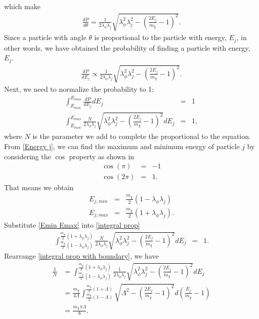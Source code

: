 \documentclass[10pt, oneside]{book}
\numberwithin{equation}{chapter}
\begin{document}
which make
\begin{eqnarray}
    \frac{dP}{d\theta} = \frac{1}{2\lambda_\phi\lambda_j} \sqrt{\lambda_\phi^2\lambda_j^2 - \left(\frac{2E_j}{m_\chi}-1\right)^2}.
\end{eqnarray}
Since a particle with angle $\theta$ is proportional to the particle with energy, $E_j$, in other words, we have obtained the probability of finding a particle with energy, $E_j$.
\begin{eqnarray}
    \frac{dP}{dE_j} \propto \frac{1}{2\lambda_\phi\lambda_j} \sqrt{\lambda_\phi^2\lambda_j^2 - \left(\frac{2E_j}{m_\chi}-1\right)^2}.
\end{eqnarray}
Next, we need to normalize the probability to 1: 
\begin{eqnarray}\label{integral prop}
    \int_{E_{min}}^{E_{max}} \frac{dP}{dE_j}dE_j &=& 1\\
    \int_{E_{min}}^{E_{max}} \frac{N}{2\lambda_\phi\lambda_j} \sqrt{\lambda_\phi^2\lambda_j^2 - \left(\frac{2E_j}{m_\chi}-1\right)^2}dE_j &=& 1,
\end{eqnarray}
where $N$ is the parameter we add to complete the proportional to the equation.
From \autoref{Energy j}, we can find the maximum and minimum energy of particle $j$ by considering the $\cos$ property as shown in 
\begin{equation}
\begin{aligned}
    \cos(\pi) &=& -1\\
    \cos(2\pi) &=& 1.
\end{aligned}
\end{equation}
That means we obtain
\begin{equation}\label{Emin Emax}
\begin{aligned}
    E_{j, min} &=& \frac{m_\chi}{2}(1-\lambda_\phi\lambda_j)\\
    E_{j, max} &=& \frac{m_\chi}{2}(1+\lambda_\phi\lambda_j).
\end{aligned}
\end{equation}
Substitute \autoref{Emin Emax} into \autoref{integral prop}
\begin{eqnarray}\label{integral prop with boundary}
    \int_{\frac{m_\chi}{2}(1-\lambda_\phi\lambda_j)}^{\frac{m_\chi}{2}(1+\lambda_\phi\lambda_j)} \frac{N}{2\lambda_\phi\lambda_j} \sqrt{\lambda_\phi^2\lambda_j^2 - \left(\frac{2E_j}{m_\chi}-1\right)^2}dE_j &=& 1.
\end{eqnarray}
Rearrange \autoref{integral prop with boundary}, we have
\begin{equation}
\begin{aligned}
    \frac{1}{N} &= \int_{\frac{m_\chi}{2}(1-\lambda_\phi\lambda_j)}^{\frac{m_\chi}{2}(1+\lambda_\phi\lambda_j)} \frac{1}{2\lambda_\phi\lambda_j} \sqrt{\lambda_\phi^2\lambda_j^2 - \left(\frac{2E_j}{m_\chi}-1\right)^2}dE_j\\
    &= \frac{m_\chi}{4\Lambda}\int_{\frac{m_\chi}{2}(1-\Lambda)}^{\frac{m_\chi}{2}(1+\Lambda)}\sqrt{\Lambda^2-\left(\frac{2E_j}{m_\chi}-1\right)^2}d\left(\frac{E_j}{m_\chi}-1\right)\\
    &= \frac{m_\chi\pi\Lambda}{8}.\\
\end{aligned}
\end{equation}
\end{document}
